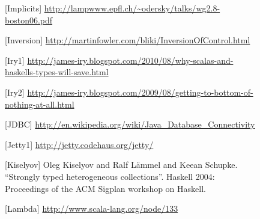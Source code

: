 \documentclass[a4]{article}
\begin{document}
\clearpage
\begin{figure}[b][Implicits]
\url{http://lampwww.epfl.ch/~odersky/talks/wg2.8-boston06.pdf}
\end{figure}
\begin{figure}[b][Inversion]
\url{http://martinfowler.com/bliki/InversionOfControl.html}
\end{figure}
\begin{figure}[b][Iry1]
\url{http://james-iry.blogspot.com/2010/08/why-scalas-and-haskells-types-will-save.html}
\end{figure}
\begin{figure}[b][Iry2]
\url{http://james-iry.blogspot.com/2009/08/getting-to-bottom-of-nothing-at-all.html}
\end{figure}
\begin{figure}[b][JDBC]
\url{http://en.wikipedia.org/wiki/Java_Database_Connectivity}
\end{figure}
\begin{figure}[b][Jetty1]
\url{http://jetty.codehaus.org/jetty/}
\end{figure}
\begin{figure}[b][Kiselyov]
Oleg Kiselyov and Ralf Lämmel and Keean Schupke. ``Strongly typed heterogeneous collections''. Haskell 2004: Proceedings of the ACM Sigplan workshop on Haskell.
\end{figure}
\begin{figure}[b][Lambda]
\url{http://www.scala-lang.org/node/133}
\end{figure}
\end{document}
